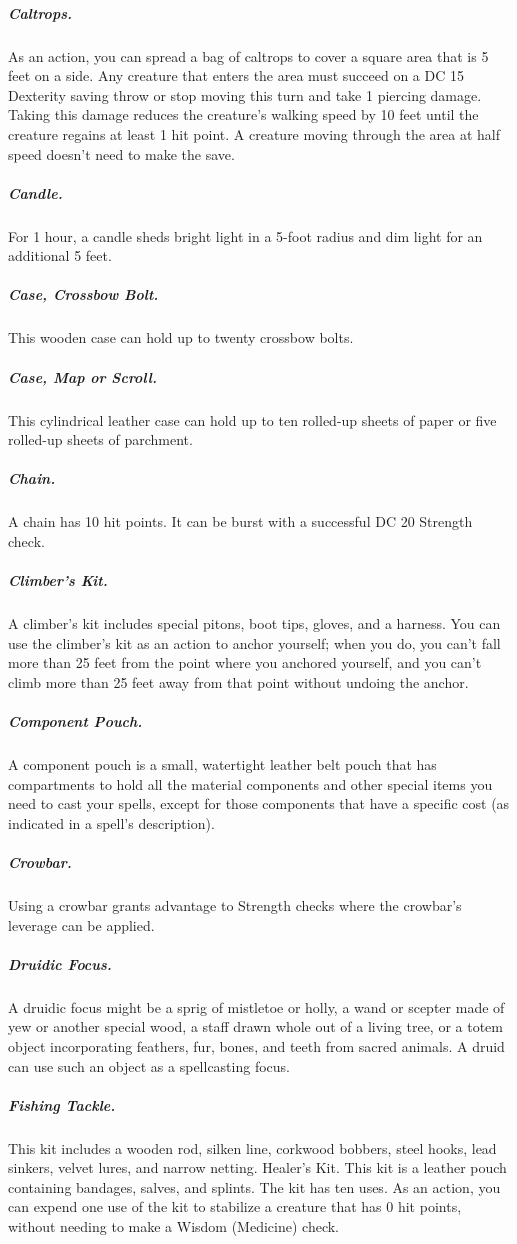 \subparagraph*{Caltrops.} As an action, you can spread a bag of caltrops to cover a square area that is 5 feet on a side. Any creature that enters the area must succeed on a DC 15 Dexterity saving throw or stop moving this turn and take 1 piercing damage. Taking this damage reduces the creature's walking speed by 10 feet until the creature regains at least 1 hit point. A creature moving through the area at half speed doesn't need to make the save.

\subparagraph*{Candle.} For 1 hour, a candle sheds bright light in a 5-foot radius and dim light for an additional 5 feet.

\subparagraph*{Case, Crossbow Bolt.} This wooden case can hold up to twenty crossbow bolts.

\subparagraph*{Case, Map or Scroll.} This cylindrical leather case can hold up to ten rolled-up sheets of paper or five rolled-up sheets of parchment.

\subparagraph*{Chain.} A chain has 10 hit points. It can be burst with a successful DC 20 Strength check.

\subparagraph*{Climber's Kit.} A climber's kit includes special pitons, boot tips, gloves, and a harness. You can use the climber's kit as an action to anchor yourself; when you do, you can't fall more than 25 feet from the point where you anchored yourself, and you can't climb more than 25 feet away from that point without undoing the anchor.

\subparagraph*{Component Pouch.} A component pouch is a small, watertight leather belt pouch that has compartments to hold all the material components and other special items you need to cast your spells, except for those components that have a specific cost (as indicated in a spell's description).
\subparagraph*{Crowbar.} Using a crowbar grants advantage to Strength checks where the crowbar's leverage can be applied.

\subparagraph*{Druidic Focus.} A druidic focus might be a sprig of mistletoe or holly, a wand or scepter made of yew or another special wood, a staff drawn whole out of a living tree, or a totem object incorporating feathers, fur, bones, and teeth from sacred animals. A druid can use such an object as a spellcasting focus.

\subparagraph*{Fishing Tackle.} This kit includes a wooden rod, silken line, corkwood bobbers, steel hooks, lead sinkers, velvet lures, and narrow netting.
Healer's Kit. This kit is a leather pouch containing bandages, salves, and splints. The kit has ten uses. As an action, you can expend one use of the kit to stabilize a creature that has 0 hit points, without needing to make a Wisdom (Medicine) check.

